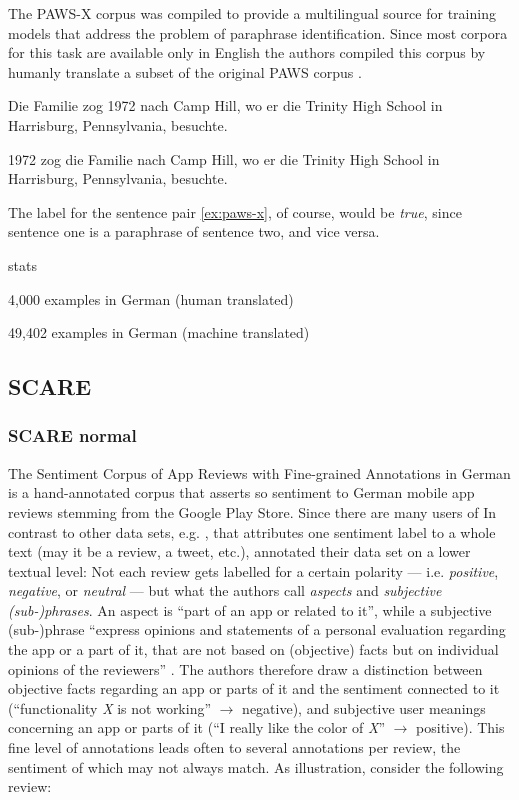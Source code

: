 The PAWS-X corpus \cite{yang2019paws} was compiled to provide a multilingual source for training models that address the problem of paraphrase identification. 
Since most corpora for this task are available only in English the authors compiled this corpus by humanly translate a subset of the original PAWS corpus \cite{zhang2019paws}.

\begin{examples}
	\label{ex:paws-x}
	\item Die Familie zog 1972 nach Camp Hill, wo er die Trinity High School in Harrisburg, Pennsylvania, besuchte.
		
	1972 zog die Familie nach Camp Hill, wo er die Trinity High School in Harrisburg, Pennsylvania, besuchte.
\end{examples}

The label for the sentence pair \ref{ex:paws-x}, of course, would be \textit{true}, since sentence one is a paraphrase of sentence two, and vice versa.


stats

4,000 examples in German (human translated)

49,402 examples in German (machine translated)



\subsection{SCARE}

\subsubsection{SCARE normal}

The Sentiment Corpus of App Reviews with Fine-grained Annotations in German \cite{sanger2016scare} is a hand-annotated corpus that asserts so sentiment to German mobile app reviews stemming from the Google Play Store.
Since there are many users of 
In contrast to other data sets, e.g. \citep{socher2013recursive, go2009twitter}, that attributes one sentiment label to a whole text (may it be a review, a tweet, etc.), \cite{sanger2016scare} annotated their data set on a lower textual level:
Not each review gets labelled for a certain polarity --- i.e. \textit{positive}, \textit{negative}, or \textit{neutral} --- but what the authors call \textit{aspects} and \textit{subjective (sub-)phrases}.
An aspect is ``part of an app or related to it'', while a subjective (sub-)phrase ``express opinions and statements of a
personal evaluation regarding the app or a part of it, that are not based on (objective) facts but on individual opinions of the reviewers'' \citep[p.~1116]{sanger2016scare}.
The authors therefore draw a distinction between objective facts regarding an app or parts of it and the sentiment connected to it (``functionality \textit{X} is not working'' $\rightarrow$ negative), and subjective user meanings concerning an app or parts of it (``I really like the color of \textit{X}'' $\rightarrow$ positive).
This fine level of annotations leads often to several annotations per review, the sentiment of which may not always match.
As illustration, consider the following review:

